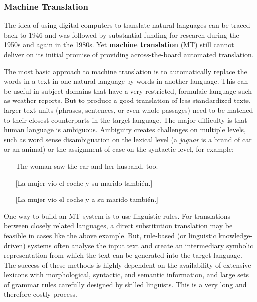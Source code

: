\begin{multicols}{2}
\subsubsection{Machine Translation}

The idea of using digital computers to translate natural languages can be traced back to 1946 and was followed by substantial funding for research during the 1950s and again in the 1980s. Yet \textbf{machine translation} (MT) still cannot deliver on its initial promise of providing across-the-board automated translation.


The most basic approach to machine translation is to automatically replace the words in a text in one natural language by words in another language. This can be useful in subject domains that have a very restricted, formulaic language such as weather reports. But to produce a good translation of less standardized texts, larger text units (phrases, sentences, or even whole passages) need to be matched to their closest counterparts in the target language. The major difficulty is that human language is ambiguous. Ambiguity creates challenges on multiple levels, such as word sense disambiguation on the lexical level (a \textit{jaguar} is a brand of car or an animal) or the assignment of case on the syntactic level, for example:

\begin{itemize}
  \item[] The woman saw the car and her husband, too.
  \item[] [La mujer vio el coche y su marido también.]
  \item[] [La mujer vio el coche y a su marido también.]
\end{itemize}

One way to build an MT system is to use linguistic rules. For translations between closely related languages, a direct substitution translation may be feasible in cases like the above example. But, rule-based (or linguistic knowledge-driven) systems often analyse the input text and create an intermediary symbolic representation from which the text can be generated into the target language. The success of these methods is highly dependent on the availability of extensive lexicons with morphological, syntactic, and semantic information, and large sets of grammar rules carefully designed by skilled linguists. This is a very long and therefore costly process.


\end{multicols}
